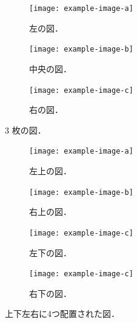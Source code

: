 \begin{figure}[tp]
    \centering
    \begin{subfigure}{0.32\columnwidth}
        \centering
        \texttt{[image: example-image-a]}
        \caption{左の図．}
        \label{subfig:three_figures_a}
    \end{subfigure}
    \hfill %
    \begin{subfigure}{0.32\columnwidth}
        \centering
        \texttt{[image: example-image-b]}
        \caption{中央の図．}
        \label{subfig:three_figures_b}
    \end{subfigure}
    \hfill %
    \begin{subfigure}{0.32\columnwidth}
        \centering
        \texttt{[image: example-image-c]}
        \caption{右の図．}
        \label{subfig:three_figures_c}
    \end{subfigure}
    \caption{3 枚の図．}
    \label{fig:three_figures}
\end{figure}

\begin{figure}[tp]
    \centering
    \begin{subfigure}{0.45\columnwidth}
        \centering
        \texttt{[image: example-image-a]}
        \caption{左上の図．}
        \label{subfig:four_figures_a}
    \end{subfigure}
    \hfill %
    \begin{subfigure}{0.45\columnwidth}
        \centering
        \texttt{[image: example-image-b]}
        \caption{右上の図．}
        \label{subfig:four_figures_b}
    \end{subfigure}

    \vspace{5mm} %
    \begin{subfigure}{0.45\columnwidth}
        \centering
        \texttt{[image: example-image-c]}
        \caption{左下の図．}
        \label{subfig:four_figures_c}
    \end{subfigure}
    \hfill %
    \begin{subfigure}{0.45\columnwidth}
        \centering
        \texttt{[image: example-image-c]}
        \caption{右下の図．}
        \label{subfig:four_figures_c2}
    \end{subfigure}
    \caption{上下左右に4つ配置された図．}
    \label{fig:four_figures}
\end{figure}

